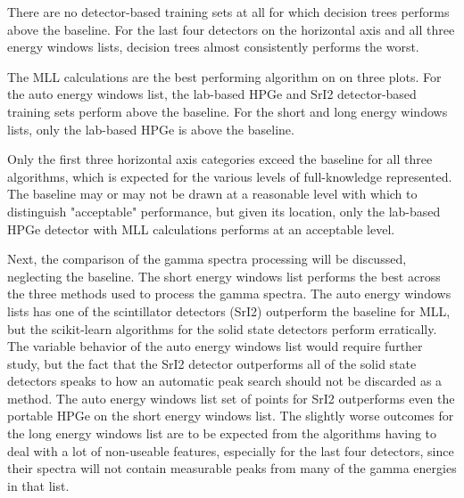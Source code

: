 There are no detector-based training sets at all for which decision trees
performs above the baseline. For the last four detectors on the horizontal axis
and all three energy windows lists, decision trees almost consistently performs
the worst. 

The \gls{MLL} calculations are the best performing algorithm on on three plots.
For the auto energy windows list, the lab-based \gls{HPGe} and \gls{SrI2}
detector-based training sets perform above the baseline. For the short and long
energy windows lists, only the lab-based \gls{HPGe} is above the baseline. 

Only the first three horizontal axis categories exceed the baseline for all
three algorithms, which is expected for the various levels of full-knowledge
represented. The baseline may or may not be drawn at a reasonable level with
which to distinguish "acceptable" performance, but given its location, only the
lab-based \gls{HPGe} detector with \gls{MLL} calculations performs at an
acceptable level.

Next, the comparison of the gamma spectra processing will be discussed,
neglecting the baseline.  The short energy windows list performs the best
across the three methods used to process the gamma spectra. The auto energy
windows lists has one of the scintillator detectors (\gls{SrI2}) outperform the
baseline for \gls{MLL}, but the scikit-learn algorithms for the solid state
detectors perform erratically.  The variable behavior of the auto energy
windows list would require further study, but the fact that the \gls{SrI2}
detector outperforms all of the solid state detectors speaks to how an
automatic peak search should not be discarded as a method.  The auto energy
windows list set of points for \gls{SrI2} outperforms even the portable
\gls{HPGe} on the short energy windows list.  The slightly worse outcomes for
the long energy windows list are to be expected from the algorithms having to
deal with a lot of non-useable features, especially for the last four
detectors, since their spectra will not contain measurable peaks from many of
the gamma energies in that list. 

